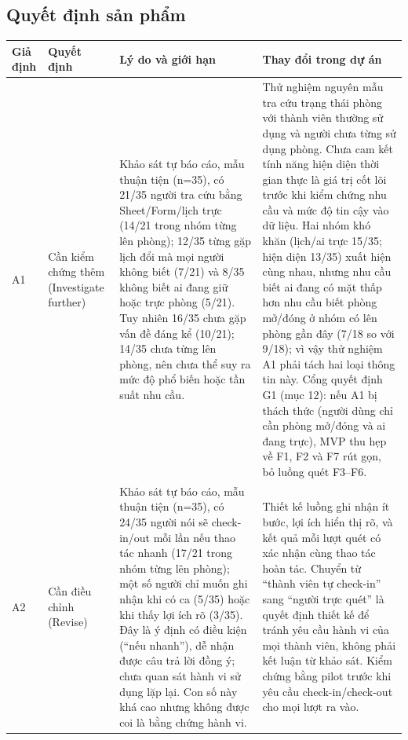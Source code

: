 \subsection{Quyết định sản phẩm}
\small
\setlength{\tabcolsep}{4pt}
\setlength{\extrarowheight}{1pt}
{\centering
\begin{tabularx}{0.94\textwidth}{|>{\raggedright\arraybackslash}p{}|>{\raggedright\arraybackslash}p{}|>{\raggedright\arraybackslash}p{}|X|}
\hline
\textbf{Giả định} & \textbf{Quyết định} & \textbf{Lý do và giới hạn} & \textbf{Thay đổi trong dự án} \\ \hline
A1 & Cần kiểm chứng thêm (Investigate further) & Khảo sát tự báo cáo, mẫu thuận tiện (n=35), có 21/35 người tra cứu bằng Sheet/Form/lịch trực (14/21 trong nhóm từng lên phòng); 12/35 từng gặp lịch đổi mà mọi người không biết (7/21) và 8/35 không biết ai đang giữ hoặc trực phòng (5/21). Tuy nhiên 16/35 chưa gặp vấn đề đáng kể (10/21); 14/35 chưa từng lên phòng, nên chưa thể suy ra mức độ phổ biến hoặc tần suất nhu cầu. & Thử nghiệm nguyên mẫu tra cứu trạng thái phòng với thành viên thường sử dụng và người chưa từng sử dụng phòng. Chưa cam kết tính năng hiện diện thời gian thực là giá trị cốt lõi trước khi kiểm chứng nhu cầu và mức độ tin cậy vào dữ liệu. Hai nhóm khó khăn (lịch/ai trực 15/35; hiện diện 13/35) xuất hiện cùng nhau, nhưng nhu cầu biết ai đang có mặt thấp hơn nhu cầu biết phòng mở/đóng ở nhóm có lên phòng gần đây (7/18 so với 9/18); vì vậy thử nghiệm A1 phải tách hai loại thông tin này. Cổng quyết định G1 (mục 12): nếu A1 bị thách thức (người dùng chỉ cần phòng mở/đóng và ai đang trực), MVP thu hẹp về F1, F2 và F7 rút gọn, bỏ luồng quét F3--F6. \\ \hline
A2 & Cần điều chỉnh (Revise) & Khảo sát tự báo cáo, mẫu thuận tiện (n=35), có 24/35 người nói sẽ check-in/out mỗi lần nếu thao tác nhanh (17/21 trong nhóm từng lên phòng); một số người chỉ muốn ghi nhận khi có ca (5/35) hoặc khi thấy lợi ích rõ (3/35). Đây là ý định có điều kiện (``nếu nhanh''), dễ nhận được câu trả lời đồng ý; chưa quan sát hành vi sử dụng lặp lại. Con số này khá cao nhưng không được coi là bằng chứng hành vi. & Thiết kế luồng ghi nhận ít bước, lợi ích hiển thị rõ, và kết quả mỗi lượt quét có xác nhận cùng thao tác hoàn tác. Chuyển từ ``thành viên tự check-in'' sang ``người trực quét'' là quyết định thiết kế để tránh yêu cầu hành vi của mọi thành viên, không phải kết luận từ khảo sát. Kiểm chứng bằng pilot trước khi yêu cầu check-in/check-out cho mọi lượt ra vào. \\ \hline
\end{tabularx}\par}
